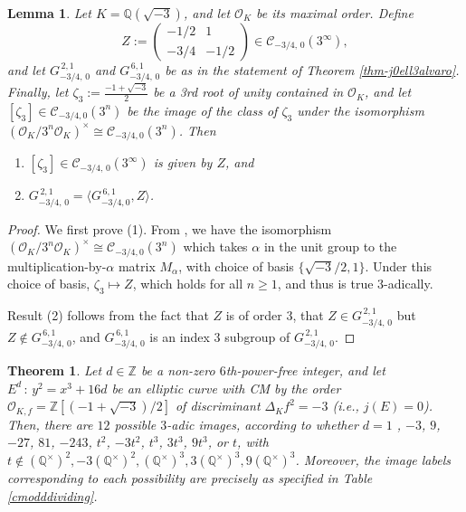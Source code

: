 \documentclass[11pt]{amsart}
\newtheorem{lemma}[defn]{Lemma}
\newtheorem{theorem}[defn]{Theorem}
\theoremstyle{definition}
\newcommand{\Q}{\mathbb Q}
\newcommand{\Z}{\mathbb Z}
\newcommand{\Of}{\mathcal{O}_{K,f}}
\newcommand{\OO}{\mathcal{O}}
\begin{document}
\begin{lemma}\label{lem-zetamat}
    Let $K = \Q(\sqrt{-3})$, and let $\OO_K$ be its maximal order. Define 
    \[ Z := \left( \begin{array}{cc}
        -1/2 & 1 \\ 
        -3/4 & -1/2
    \end{array} \right) \in \mathcal{C}_{-3/4, \, 0}(3^{\infty}), \]
    and let $G^{\, 2,1}_{-3/4, \, 0}$ and $G^{\, 6,1}_{-3/4, \, 0}$ be as in the statement of Theorem \ref{thm-j0ell3alvaro}. Finally, let $\zeta_3 := \frac{-1 + \sqrt{-3}}{2}$ be a 3rd root of unity contained in $\OO_K$, and let $[\zeta_3]\in \mathcal{C}_{-3/4, 0}(3^n)$ be the image of the class of $\zeta_3$ under the isomorphism $(\OO_K/3^n \OO_K)^{\times} \cong \mathcal{C}_{-3/4, 0}(3^n)$. Then
    \begin{enumerate}
        \item $[\zeta_3]\in \mathcal{C}_{-3/4, \, 0}(3^{\infty})$ is given by $Z$, and
        \item $G^{\, 2,1}_{-3/4, \, 0} = 
        \langle G^{\, 6,1}_{-3/4, 0}, Z \rangle$.
    \end{enumerate}

\end{lemma}

\begin{proof}
We first prove (1). From \cite[Remark 2.6]{lozano-galoiscm}, we have the isomorphism $(\OO_K/3^n \OO_K)^{\times} \cong \mathcal{C}_{-3/4, 0}(3^n)$ which takes $\alpha$ in the unit group to the multiplication-by-$\alpha$ matrix $M_{\alpha}$, with choice of basis $\{ \sqrt{-3}/2, 1 \}$. Under this choice of basis, $\zeta_3 \mapsto Z$, which holds for all $n \geq 1$, and thus is true $3$-adically.

Result (2) follows from the fact that $Z$ is of order 3, that $Z \in G^{\, 2,1}_{-3/4, \, 0}$ but $Z \notin G^{\, 6,1}_{-3/4, \, 0}$, and  $G^{\, 6,1}_{-3/4, \, 0}$ is an index 3 subgroup of $G^{\, 2,1}_{-3/4, \, 0}$.

\end{proof}


\begin{theorem}\label{j0ell3-ver}
    Let $d\in \Z$ be a non-zero $6$th-power-free integer, and let $E^d\,:\,y^2=x^3 + 16d$ be an elliptic curve with CM by the order $\Of=\Z[(-1+\sqrt{-3})/2]$ of discriminant $\Delta_K f^2=-3$ (i.e., $j(E)=0$). Then, there are $12$ possible $3$-adic images, according to whether $d = 1$ , $-3$, $9$, $-27$, $81$, $-243$, $t^2$, $-3t^2$, $t^3$, $3t^3$, $9t^3$, or $t$, with $t\notin (\Q^\times)^2, -3(\Q^\times)^2, (\Q^\times)^3, 3(\Q^\times)^3, 9(\Q^\times)^3$. Moreover, the image labels corresponding to each possibility are precisely as specified in Table \ref{cmodddividing}.
\end{theorem}
\end{document}
